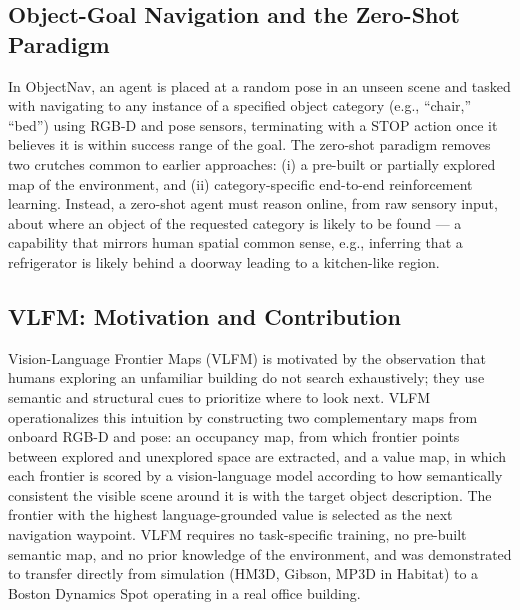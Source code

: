 \documentclass[conference]{IEEEtran}
\begin{document}
\subsection{Object-Goal Navigation and the Zero-Shot Paradigm}
In ObjectNav, an agent is placed at a random pose in an unseen scene and tasked with navigating to any instance of a specified object category (e.g., ``chair,'' ``bed'') using RGB-D and pose sensors, terminating with a STOP action once it believes it is within success range of the goal. The zero-shot paradigm removes two crutches common to earlier approaches: (i) a pre-built or partially explored map of the environment, and (ii) category-specific end-to-end reinforcement learning. Instead, a zero-shot agent must reason online, from raw sensory input, about where an object of the requested category is likely to be found --- a capability that mirrors human spatial common sense, e.g., inferring that a refrigerator is likely behind a doorway leading to a kitchen-like region.

\subsection{VLFM: Motivation and Contribution}
Vision-Language Frontier Maps (VLFM) \cite{vlfm} is motivated by the observation that humans exploring an unfamiliar building do not search exhaustively; they use semantic and structural cues to prioritize where to look next. VLFM operationalizes this intuition by constructing two complementary maps from onboard RGB-D and pose: an occupancy map, from which frontier points between explored and unexplored space are extracted, and a value map, in which each frontier is scored by a vision-language model according to how semantically consistent the visible scene around it is with the target object description. The frontier with the highest language-grounded value is selected as the next navigation waypoint. VLFM requires no task-specific training, no pre-built semantic map, and no prior knowledge of the environment, and was demonstrated to transfer directly from simulation (HM3D, Gibson, MP3D in Habitat) to a Boston Dynamics Spot operating in a real office building.
\end{document}
